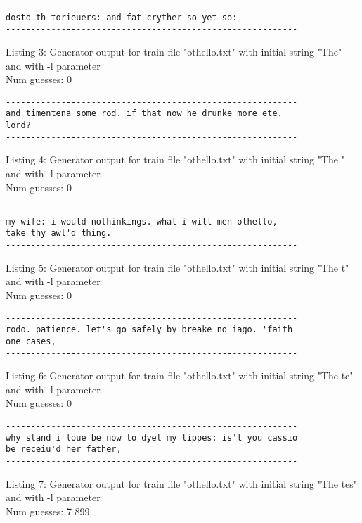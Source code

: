 \documentclass{article}
\begin{document}
\begin{lstlisting}
----------------------------------------------------------
dosto th torieuers: and fat cryther so yet so:
----------------------------------------------------------
\end{lstlisting}

Listing 3: Generator output for train file "othello.txt" with initial string "The" and with -l parameter
\\Num guesses: 0

\begin{lstlisting}
----------------------------------------------------------
and timentena some rod. if that now he drunke more ete. 
lord?
----------------------------------------------------------
\end{lstlisting}

Listing 4: Generator output for train file "othello.txt" with initial string "The " and with -l parameter
\\Num guesses: 0

\begin{lstlisting}
----------------------------------------------------------
my wife: i would nothinkings. what i will men othello, 
take thy awl'd thing.
----------------------------------------------------------
\end{lstlisting}

Listing 5: Generator output for train file "othello.txt" with initial string "The t" and with -l parameter
\\Num guesses: 0

\begin{lstlisting}
----------------------------------------------------------
rodo. patience. let's go safely by breake no iago. 'faith 
one cases,
----------------------------------------------------------
\end{lstlisting}

Listing 6: Generator output for train file "othello.txt" with initial string "The te" and with -l parameter
\\Num guesses: 0

\begin{lstlisting}
----------------------------------------------------------
why stand i loue be now to dyet my lippes: is't you cassio 
be receiu'd her father,
----------------------------------------------------------
\end{lstlisting}

Listing 7: Generator output for train file "othello.txt" with initial string "The tes" and with -l parameter
\\Num guesses: 7 899
\end{document}

